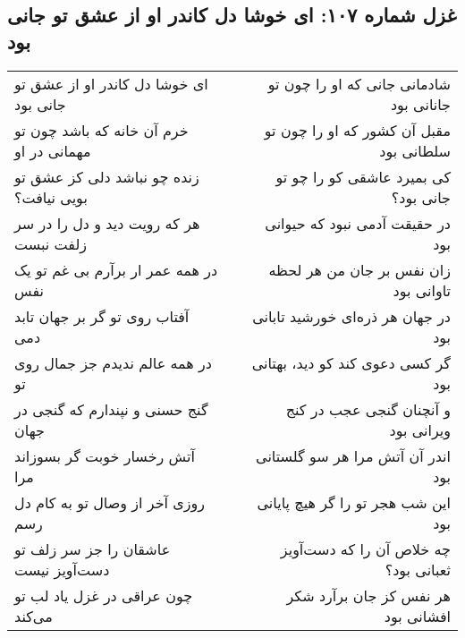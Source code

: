 \begin{center}
\section*{غزل شماره ۱۰۷: ای خوشا دل کاندر او از عشق تو جانی بود}
\label{sec:107}
\begin{longtable}{l p{0.5cm} r}
ای خوشا دل کاندر او از عشق تو جانی بود
&&
شادمانی جانی که او را چون تو جانانی بود
\\
خرم آن خانه که باشد چون تو مهمانی در او
&&
مقبل آن کشور که او را چون تو سلطانی بود
\\
زنده چو نباشد دلی کز عشق تو بویی نیافت؟
&&
کی بمیرد عاشقی کو را چو تو جانی بود؟
\\
هر که رویت دید و دل را در سر زلفت نبست
&&
در حقیقت آدمی نبود که حیوانی بود
\\
در همه عمر ار برآرم بی غم تو یک نفس
&&
زان نفس بر جان من هر لحظه تاوانی بود
\\
آفتاب روی تو گر بر جهان تابد دمی
&&
در جهان هر ذره‌ای خورشید تابانی بود
\\
در همه عالم ندیدم جز جمال روی تو
&&
گر کسی دعوی کند کو دید، بهتانی بود
\\
گنج حسنی و نپندارم که گنجی در جهان
&&
و آنچنان گنجی عجب در کنج ویرانی بود
\\
آتش رخسار خوبت گر بسوزاند مرا
&&
اندر آن آتش مرا هر سو گلستانی بود
\\
روزی آخر از وصال تو به کام دل رسم
&&
این شب هجر تو را گر هیچ پایانی بود
\\
عاشقان را جز سر زلف تو دست‌آویز نیست
&&
چه خلاص آن را که دست‌آویز ثعبانی بود؟
\\
چون عراقی در غزل یاد لب تو می‌کند
&&
هر نفس کز جان برآرد شکر افشانی بود
\\
\end{longtable}
\end{center}
